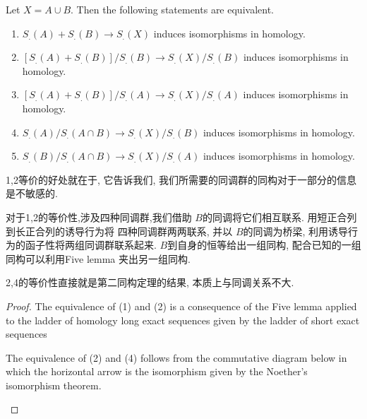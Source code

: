 \documentclass[../main.tex]{subfiles}
\begin{document}
\begin{lemma}{}{}
Let $X = A \cup B$. Then the following statements are equivalent.
\begin{enumerate}
    \item $S_.(A) + S_.(B) \to S_.(X)$ induces isomorphisms in homology.
    \item $[S_.(A) + S_.(B)]/S_.(B) \to S_.(X)/S_.(B)$ induces isomorphisms in homology.
    \item $[S_.(A) + S_.(B)]/S_.(A) \to S_.(X)/S_.(A)$ induces isomorphisms in homology.
    \item $S_.(A)/S_.(A \cap B) \to S_.(X)/S_.(B)$ induces isomorphisms in homology.
    \item $S_.(B)/S_.(A \cap B) \to S_.(X)/S_.(A)$ induces isomorphisms in homology.
\end{enumerate}
\end{lemma}
\begin{note}
    1,2等价的好处就在于, 它告诉我们, 我们所需要的同调群的同构对于一部分的信息是不敏感的. 
\end{note}
\begin{proofsketch}
    对于1,2的等价性,涉及四种同调群,我们借助 \(  B  \)的同调将它们相互联系.  用短正合列到长正合列的诱导行为将 四种同调群两两联系, 并以 \(  B  \)的同调为桥梁, 利用诱导行为的函子性将两组同调群联系起来.  \(  B  \)到自身的恒等给出一组同构, 配合已知的一组同构可以利用Five lemma 夹出另一组同构.

    2,4的等价性直接就是第二同构定理的结果, 本质上与同调关系不大.
\end{proofsketch}
\begin{proof}
The equivalence of (1) and (2) is a consequence of the Five lemma applied to the ladder of homology long exact sequences given by the ladder of short exact sequences
\begin{center}
\end{center}

The equivalence of (2) and (4) follows from the commutative diagram below in which the horizontal arrow is the isomorphism given by the Noether's isomorphism theorem.
\begin{center}
\end{center}


\end{proof}
\end{document}
